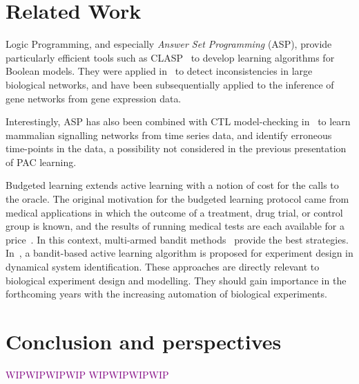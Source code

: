 \documentclass{llncs}
\newcommand{\wip}[1]{\textcolor{Purple}{WIPWIPWIPWIP #1 WIPWIPWIPWIP}}
\begin{document}
\section{Related Work}

Logic Programming, and especially \emph{Answer Set Programming} (ASP), provide particularly efficient tools such as CLASP~\cite{GKNS07lpnmr} to develop learning algorithms for Boolean models.
They were applied in~\cite{GSTUV08iclp} to detect inconsistencies in large biological networks,
and have been subsequentially applied to the inference of gene networks from gene expression data.

Interestingly, ASP has also been combined with CTL model-checking in~\cite{OPSSG16biosystems} to learn mammalian signalling networks from time series data,
and identify erroneous time-points in the data, a possibility not considered in the previous presentation of PAC learning.


Budgeted learning extends active learning with a notion of cost for the calls to the oracle.
The original motivation for the budgeted learning protocol came from medical applications in which the outcome of a treatment,
drug trial, or control group is known, and the results of running medical tests are each available for a price~\cite{DZBSM13ml}.
In this context, multi-armed bandit methods~\cite{DBSSZ07icdm} provide the best strategies.
In~\cite{LMALS14ecml}, a bandit-based active learning algorithm is proposed for experiment design in dynamical system identification.
These approaches are directly relevant to biological experiment design and modelling. %
They should gain importance in the forthcoming years with the increasing automation of biological experiments.





\section{Conclusion and perspectives}
\wip{}



\end{document}
